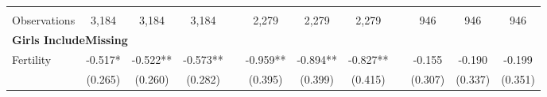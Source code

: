 \begin{landscape}
\begin{table}[htpb!]
\begin{center}
\begin{tabular}{lcccp{2mm}cccp{2mm}ccc}
\begin{footnotesize}\end{footnotesize}&\begin{footnotesize}\end{footnotesize}&\begin{footnotesize}\end{footnotesize}&\begin{footnotesize}\end{footnotesize}&\begin{footnotesize}\end{footnotesize}&\begin{footnotesize}\end{footnotesize}&\begin{footnotesize}\end{footnotesize}&\begin{footnotesize}\end{footnotesize}&\begin{footnotesize}\end{footnotesize}&\begin{footnotesize}\end{footnotesize}&\begin{footnotesize}\end{footnotesize}&\begin{footnotesize}\end{footnotesize}\\Observations&3,184&3,184&3,184&&2,279&2,279&2,279&&946&946&946\\
\multicolumn{12}{l}{\textbf{Girls IncludeMissing}}\\ 
Fertility&-0.517*&-0.522**&-0.573**&&-0.959**&-0.894**&-0.827**&&-0.155&-0.190&-0.199\\
&(0.265)&(0.260)&(0.282)&&(0.395)&(0.399)&(0.415)&&(0.307)&(0.337)&(0.351)\\

\end{tabular}
\end{center}
\end{table}
\end{landscape}
